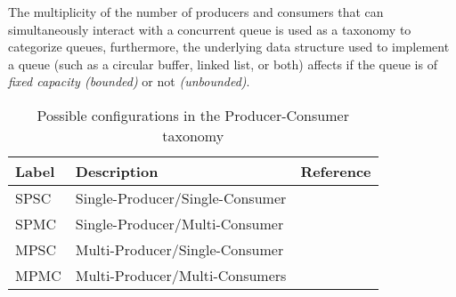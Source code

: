 The multiplicity of the number of producers and
consumers that can simultaneously interact with a concurrent queue is used as a
taxonomy to categorize queues, furthermore, the underlying
data structure used to implement a queue (such as a circular buffer,
linked list, or both) affects if the queue is of \emph{fixed capacity (bounded)} or not
\emph{(unbounded)}.

\begin{table*}[h]\centering
\caption{Possible configurations in the Producer-Consumer taxonomy}\label{tab:producer_consumer}
    \begin{tabular}{lll}
        \hline
        Label & Description & Reference \\ \hline
        SPSC & Single-Producer/Single-Consumer & \citep{aldinucci2012efficient} \\
        SPMC & Single-Producer/Multi-Consumer & \citep{arnautov2017ffq} \\
        MPSC & Multi-Producer/Single-Consumer & \\
        MPMC & Multi-Producer/Multi-Consumers & \citep{michael1996simple,valois1994queues,hoffman2007baskets}\\ \hline
    \end{tabular}        
\end{table*}




